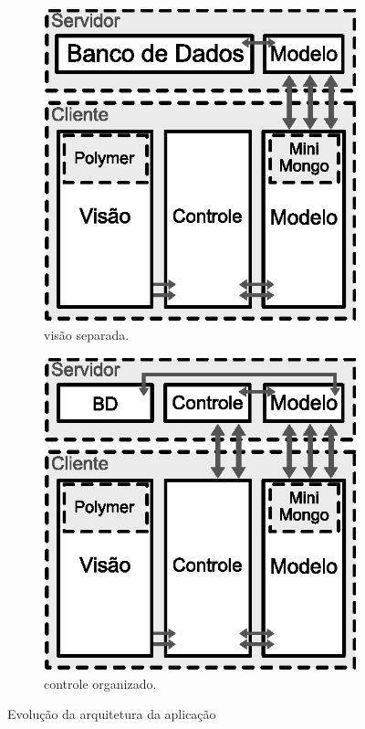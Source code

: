 \begin{figure}[h!]
	\begin{subfigure}{.34\textwidth}
  		\centering
  		\includegraphics[width=.9\linewidth]{figuras/arquitetura3.eps}
  		\caption{visão separada.}
  		\label{fig:subarq3}
	\end{subfigure}%
	\begin{subfigure}{.34\textwidth}
  		\centering
  		\includegraphics[width=.9\linewidth]{figuras/arquitetura4.eps}
  		\caption{controle organizado.}
  		\label{fig:subarq4}
	\end{subfigure}
	\caption{Evolução da arquitetura da aplicação}
	\label{fig:arquitetura}
\end{figure}

